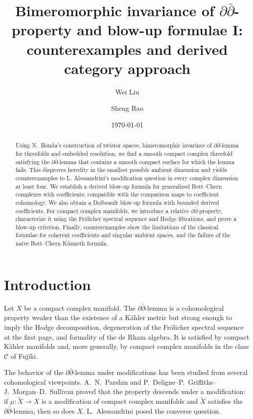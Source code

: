 \documentclass[11pt]{amsart}
\title[Bimeromorphic invariance and blow-up formulae I]
{Bimeromorphic invariance of $\partial\bar\partial$-property and blow-up formulae I:
counterexamples and derived category approach}
\author{Wei Liu}
\author{Sheng Rao}
\date{\today}
\numberwithin{equation}{section}
\def\mc{\mathcal}
\theoremstyle{plain}
\theoremstyle{definition}
\begin{document}
\begin{abstract}
Using N.~Honda's construction of twistor spaces, bimeromorphic  invarince of $\partial\bar\partial$-lemma for threefolds and embedded resolution, we find a smooth compact complex threefold satisfying the
$\partial\bar\partial$-lemma that contains a smooth compact surface
for which the lemma fails.  This disproves heredity in the smallest
possible ambient dimension and yields counterexamples to
L. Alessandrini's modification question in every complex dimension at
least four.  We establish a derived blow-up formula for generalized
Bott--Chern complexes with coefficients, compatible with the comparison
maps to coefficient cohomology.
We also obtain a Dolbeault blow-up formula with bounded derived
coefficients.  For compact complex manifolds, we introduce a relative
$\partial\bar\partial$-property, characterize it using the
Fr\"olicher spectral sequence and Hodge filtrations, and prove a
blow-up criterion.  Finally, counterexamples show the limitations of
the classical formulae for coherent coefficients and singular ambient
spaces, and the failure of the naive Bott--Chern K\"unneth formula.
\end{abstract}

\maketitle

\setcounter{tocdepth}{1}
\tableofcontents

\section{Introduction}
\label{Introduction}

Let $X$ be a compact complex manifold.  The $\partial\bar\partial$-lemma is a
cohomological property weaker than the existence of a K\"ahler metric but
strong enough to imply the Hodge decomposition, degeneration of the
Fr\"olicher spectral sequence at the first page, and formality of the de Rham
algebra.  It is satisfied by compact K\"ahler manifolds and, more generally,
by compact complex manifolds in the class $\mc C$ of Fujiki.

The behavior of the $\partial\bar\partial$-lemma under modifications has been
studied from several cohomological viewpoints.  A.~N.~Parshin
\cite[\S\S~4 and 5]{Pr66} and P.~Deligne--P.~Griffiths--J.~Morgan--D.~Sullivan \cite[Theorem 5.22]{DGMS75} proved that the property descends
under a modification: if $\mu:\tilde{X}\to X$ is a modification of compact complex
manifolds and $\tilde{X}$ satisfies the $\partial\bar\partial$-lemma, then so does
$X$.  L.~Alessandrini posed the converse question.
\end{document}
